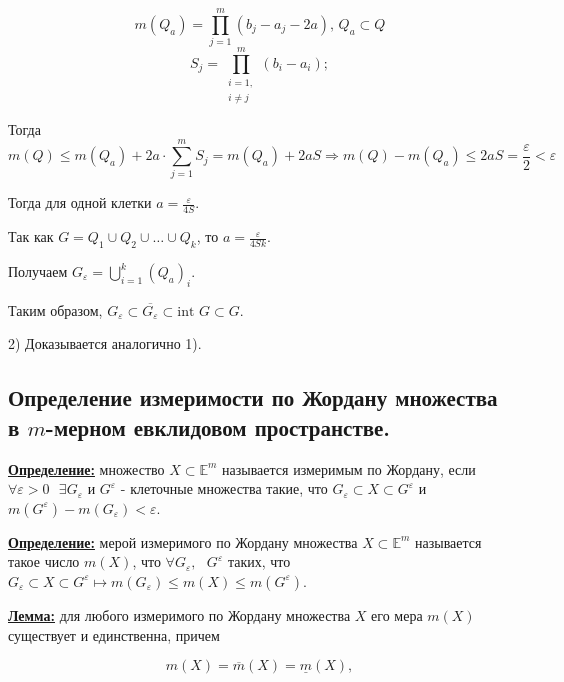 \documentclass[a4paper,12pt]{article} %
\begin{document}
	\[m(Q_a) = \prod\limits_{j = 1}^m (b_j - a_j - 2a) \text{, }  Q_a \subset Q \]
	\[S_j = \prod\limits_{\substack{i = 1,\\ i \neq j}}^m (b_i - a_i);\]
	
	Тогда
	\[m(Q) \leqslant m(Q_a) + 2a\cdot\sum\limits_{j = 1}^m S_j = m(Q_a) + 2aS \Rightarrow m(Q) - m(Q_a) \leqslant 2aS = \frac{\varepsilon}{2} < \varepsilon \]
	
	Тогда для одной клетки $a = \frac{\varepsilon}{4S}$.
	
	Так как $G = Q_1 \cup Q_2 \cup \ldots \cup Q_k$, то $a = \frac{\varepsilon}{4Sk}$.
	
	Получаем $G_{\varepsilon} = \bigcup\limits_{i = 1}^k (Q_a)_i$.
	
	Таким образом, $G_{\varepsilon} \subset \overline{G_{\varepsilon}} \subset \text{int } G \subset G$.
	
	\vspace{3mm}
	2) Доказывается аналогично 1).\\
	
	
	\subsection{Определение измеримости по Жордану множества в $m$-мерном евклидовом пространстве.}
	
	\underline{\textbf{Определение:}} множество $X \subset \mathbb{E}^m$ называется измеримым по Жордану, если $\forall \varepsilon > 0 \text{ }\exists G_{\varepsilon}$ и $G^{\varepsilon}$ - клеточные множества такие, что $G_{\varepsilon} \subset X \subset G^{\varepsilon}$ и $m(G^{\varepsilon}) - m(G_{\varepsilon}) < \varepsilon$. 
	
	\vspace{3mm}
	
	\underline{\textbf{Определение:}} мерой измеримого по Жордану множества $X \subset \mathbb{E}^m$ называется такое число $m(X)$, что $\forall G_{\varepsilon},\text{ } G^{\varepsilon}$ таких, что $G_{\varepsilon} \subset X \subset G^{\varepsilon} \longmapsto m(G_{\varepsilon}) \leqslant m(X) \leqslant m(G^{\varepsilon})$.
	
	\vspace{3mm}
	
	\underline{\textbf{Лемма:}} для любого измеримого по Жордану множества $X$ его мера $m(X)$ существует и единственна, причем
	
	\begin{equation*}
		m(X) = \overline{m}(X) = \underline{m}(X),
	\end{equation*}
	
\end{document}
